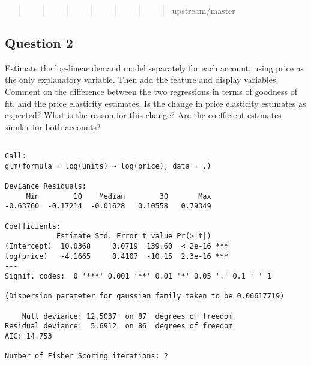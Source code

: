 \documentclass[]{article}
\newenvironment{Shaded}{\begin{snugshade}}{\end{snugshade}}
\newcommand{\DataTypeTok}[1]{\textcolor[rgb]{0.13,0.29,0.53}{#1}}
\newcommand{\KeywordTok}[1]{\textcolor[rgb]{0.13,0.29,0.53}{\textbf{#1}}}
\newcommand{\NormalTok}[1]{#1}
\newcommand{\OperatorTok}[1]{\textcolor[rgb]{0.81,0.36,0.00}{\textbf{#1}}}
\newcommand{\StringTok}[1]{\textcolor[rgb]{0.31,0.60,0.02}{#1}}
\begin{document}
\begin{quote}
\begin{quote}
\begin{quote}
\begin{quote}
\begin{quote}
\begin{quote}
\begin{quote}
upstream/master
\end{quote}
\end{quote}
\end{quote}
\end{quote}
\end{quote}
\end{quote}
\end{quote}

\newpage

\hypertarget{question-2}{%
\subsection{Question 2}\label{question-2}}

Estimate the log-linear demand model separately for each account, using
price as the only explanatory variable. Then add the feature and display
variables. Comment on the difference between the two regressions in
terms of goodness of fit, and the price elasticity estimates. Is the
change in price elasticity estimates as expected? What is the reason for
this change? Are the coefficient estimates similar for both accounts?

\begin{Shaded}
\end{Shaded}

\begin{verbatim}

Call:
glm(formula = log(units) ~ log(price), data = .)

Deviance Residuals: 
     Min        1Q    Median        3Q       Max  
-0.63760  -0.17214  -0.01628   0.10558   0.79349  

Coefficients:
            Estimate Std. Error t value Pr(>|t|)    
(Intercept)  10.0368     0.0719  139.60  < 2e-16 ***
log(price)   -4.1665     0.4107  -10.15  2.3e-16 ***
---
Signif. codes:  0 '***' 0.001 '**' 0.01 '*' 0.05 '.' 0.1 ' ' 1

(Dispersion parameter for gaussian family taken to be 0.06617719)

    Null deviance: 12.5037  on 87  degrees of freedom
Residual deviance:  5.6912  on 86  degrees of freedom
AIC: 14.753

Number of Fisher Scoring iterations: 2
\end{verbatim}
\end{document}
